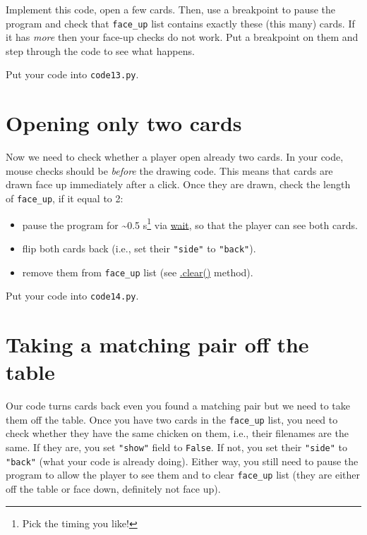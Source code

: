 \documentclass[
]{book}
\providecommand{\tightlist}{%
  \setlength{\itemsep}{0pt}\setlength{\parskip}{0pt}}
\begin{document}
Implement this code, open a few cards. Then, use a breakpoint to pause the program and check that \texttt{face\_up} list contains exactly these (this many) cards. If it has \emph{more} then your face-up checks do not work. Put a breakpoint on them and step through the code to see what happens.

Put your code into \texttt{code13.py}.

\hypertarget{opening-only-two-cards}{%
\section{Opening only two cards}\label{opening-only-two-cards}}

Now we need to check whether a player open already two cards. In your code, mouse checks should be \emph{before} the drawing code. This means that cards are drawn face up immediately after a click. Once they are drawn, check the length of \texttt{face\_up}, if it equal to 2:

\begin{itemize}
\tightlist
\item
  pause the program for \textasciitilde0.5 s\footnote{Pick the timing you like!} via \href{https://psychopy.org/api/clock.html\#psychopy.clock.wait}{wait}, so that the player can see both cards.
\item
  flip both cards back (i.e., set their \texttt{"side"} to \texttt{"back"}).
\item
  remove them from \texttt{face\_up} list (see \href{https://docs.python.org/3/tutorial/datastructures.html\#more-on-lists}{.clear()} method).
\end{itemize}

Put your code into \texttt{code14.py}.

\hypertarget{taking-a-matching-pair-off-the-table}{%
\section{Taking a matching pair off the table}\label{taking-a-matching-pair-off-the-table}}

Our code turns cards back even you found a matching pair but we need to take them off the table. Once you have two cards in the \texttt{face\_up} list, you need to check whether they have the same chicken on them, i.e., their filenames are the same. If they are, you set \texttt{"show"} field to \texttt{False}. If not, you set their \texttt{"side"} to \texttt{"back"} (what your code is already doing). Either way, you still need to pause the program to allow the player to see them and to clear \texttt{face\_up} list (they are either off the table or face down, definitely not face up).
\end{document}
